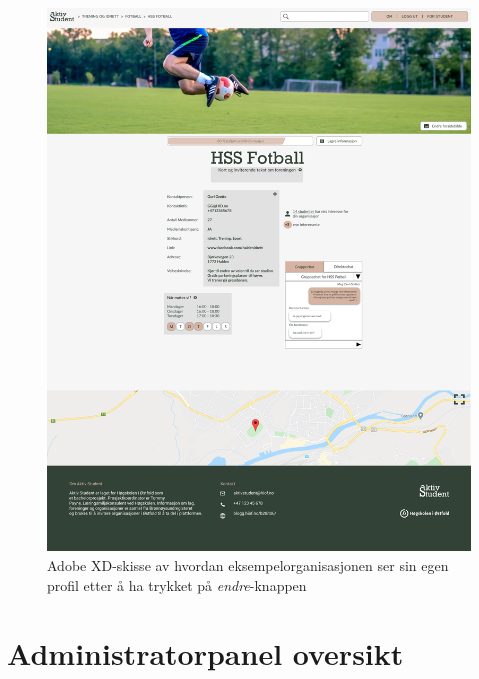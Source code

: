 \begin{figure}[H]
\centering
\includegraphics[width=\textwidth]{Illustrasjoner/Skisser-pdf/3.0/3-18-endre-info-organisasjon.pdf}
\caption{Adobe XD-skisse av hvordan eksempelorganisasjonen ser sin egen profil etter å ha trykket på {\em endre}-knappen}
\label{vedlegg:3-18-endre-info-org}
\end{figure}

\section{Administratorpanel oversikt}

